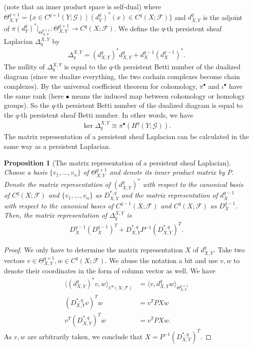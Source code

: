 \documentclass[11pt]{article}
\newtheorem{proposition}{Proposition}[section]
\theoremstyle{definition}
\theoremstyle{definition}
\newcommand{\lgl}{\langle}
\newcommand{\rgl}{\rangle}
\begin{document}
(note that an inner product space is self-dual) where $\Theta_{X,Y}^{q+1} = \{x \in C^{q+1}(Y; \mathscr{G}) \mid (d^{q}_{Y})^{\ast}(x) \in C^{q}(X; \mathscr{F})\}$ and 
$d^{q}_{X,Y}$ is the adjoint of $\pi (d^{q}_{Y})^{\ast}\vert_{\Theta^{q+1}_{X,Y}}: \Theta^{q+1}_{X,Y} \to C^q(X;\mathscr{F})$.
We define the $q$-th persistent sheaf Laplacian $\Delta_q^{X,Y}$ by
\begin{align*}
    \Delta_q^{X,Y} = (d^{q}_{X,Y})^{\ast} d^{q}_{X,Y} +  d^{q-1}_X (d^{q-1}_X)^{\ast}.
\end{align*}
The nullity of $\Delta_q^{X,Y}$ is equal to the $q$-th persistent Betti number of the dualized diagram (since we dualize everything, the two cochain complexes become chain complexes).
By the universal coefficient theorem for cohomology, $\pi^{\bullet}$ and $\iota^{\bullet}$ have the same rank (here $\bullet$ means the induced map between cohomology or homology groups).
So the $q$-th persistent Betti number of the dualized diagram is equal to the $q$-th persistent sheaf Betti number.
In other words, we have 
\begin{align*}
    \ker \Delta_q^{X,Y} \cong \pi^{\bullet}(H^q(Y;\mathscr{G})).
\end{align*}
The matrix representation of a persistent sheaf Laplacian can be calculated in the same way as a persistent Laplacian.
\begin{proposition}
    [The matrix representation of a persistent sheaf Laplacian] Choose a basis $\{v_1, \dots, v_n\}$ of
    $\Theta^{q+1}_{X,Y}$ and denote its inner product matrix by $P$. 
    Denote the matrix representation of $(d^q_{X,Y})^{\ast}$ 
    with respect to the canonical basis of $C^q(X; \mathscr{F})$ and $\{v_1, \dots, v_n\}$ as $D^{\ast,q}_{X,Y}$
    and the matrix representation of $d^{q-1}_{X}$ with respect to the canonical bases of $C^{q-1}(X; \mathscr{F})$ 
    and $C^q(X; \mathscr{F})$ as $D^{q-1}_X$. 
    Then, the matrix representation of $\Delta_{q}^{X,Y}$ is 
    \begin{align*}
        D^{q-1}_{X}(D^{q-1}_X)^T + D^{\ast,q}_{X,Y} P^{-1}(D^{\ast,q}_{X,Y})^T.
    \end{align*}
\end{proposition}

\begin{proof}
    We only have to determine the matrix representation $X$ of $d^q_{X,Y}$. 
    Take two vectors $v\in \Theta_{X,Y}^{q+1}, w \in C^q(X; \mathscr{F})$. 
    We abuse the notation a bit and use $v,w$ to denote their coordinates in the form of column vector as well. We have 
    \begin{align}
        \lgl (d^{q}_{X,Y})^{\ast} v,  w\rgl_{C^q(X; \mathscr{F})} &= \lgl v, d^{q}_{X, Y}w \rgl_{\Theta_{X,Y}^{q+1}} \\
        (D_{X,Y}^{\ast, q}v)^Tw &= v^TPXw \\
        v^T(D_{X,Y}^{\ast, q})^Tw &= v^TPXw. 
    \end{align}As $v, w$ are arbitrarily taken, we conclude that $X = P^{-1}(D_{X,Y}^{\ast, q})^T$.
\end{proof}
\end{document}
